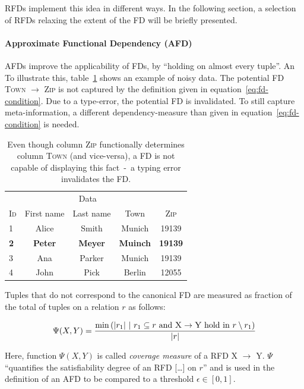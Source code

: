 RFDs implement this idea in different ways.
In the following section, a selection of RFDs relaxing the extent of the FD will be briefly presented.

\paragraph{Approximate Functional Dependency (AFD)}
AFDs improve the applicability of FDs, by ``holding on almost every tuple''\cite[p.~151]{CAR16}.
An To illustrate this, table~\ref{tab:example-afd-necessity} shows an example of noisy data.
The potential FD \textsc{Town} \(\to\) \textsc{Zip} is not captured by the definition given in equation~\ref{eq:fd-condition}.
Due to a type-error, the potential FD is invalidated.
To still capture meta-information, a different dependency-measure than given in equation~\ref{eq:fd-condition} is needed.

\begin{table}[ht]
    \centering
    \begin{tabular}{lcccc}
        \toprule
        & \multicolumn{3}{c}{Data} \\ \cmidrule(lr){2-5}
        \textsc{Id} & First name & Last name & Town & \textsc{Zip} \\
        \midrule
        1 & Alice & Smith & Munich & 19139 \\
        \textbf{2} & \textbf{Peter}& \textbf{Meyer} &
        \textbf{Muinch} & \textbf{19139} \\
        3 & Ana & Parker & Munich & 19139  \\
        4 & John & Pick & Berlin & 12055 \\
        \bottomrule
    \end{tabular}
    \caption{Even though column \textsc{Zip} functionally determines column \textsc{Town} (and vice-versa), a FD is not capable of displaying this fact~-~a typing error invalidates the FD.}
    \label{tab:example-afd-necessity}
\end{table}

Tuples that do not correspond to the canonical FD are measured as fraction of the total of tuples on a relation \( r \) as follows:

\begin{align}
    \Psi(X, Y) = \frac{\min{\left(|r_1|~|~r_1 \subseteq r \text{ and } \textsc{X} \rightarrow \textsc{Y} \text{ hold in } r \setminus r_1 \right)}}{|r|}
\end{align}

Here, function \( \Psi(X, Y) \) is called \emph{coverage measure} of a RFD \textsc{X} \( \to \) \textsc{Y}.
\( \Psi \) ``quantifies the satisfiability degree of an RFD [\dots] on \( r \)''\cite[p.~150]{CAR16} and is used in the definition of an AFD to be compared to a threshold \( \epsilon \in [0, 1] \).

